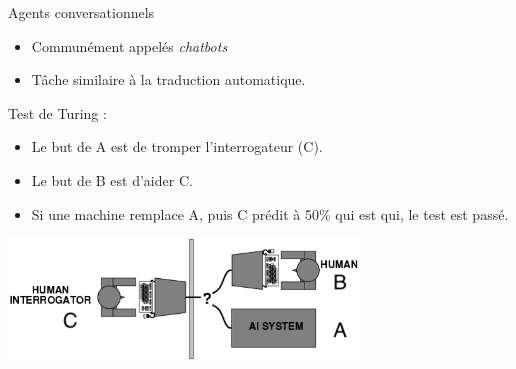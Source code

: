 \documentclass[french]{beamer}
\begin{document}
\begin{frame}{Agents conversationnels}

\begin{itemize}
	\item Communément appelés \textit{chatbots}
	\item Tâche similaire à la traduction automatique. 
\end{itemize}

Test de Turing \cite{turing2009computing} :
\begin{itemize}
	\item Le but de A est de tromper l'interrogateur (C).
	\item Le but de B est d'aider C.
	\item Si une machine remplace A, puis C prédit à 50\% qui est qui, le test est passé.
\end{itemize}

\centering
\includegraphics[width=0.7\textwidth]{figures/turing_test}

\end{frame}
\end{document}
